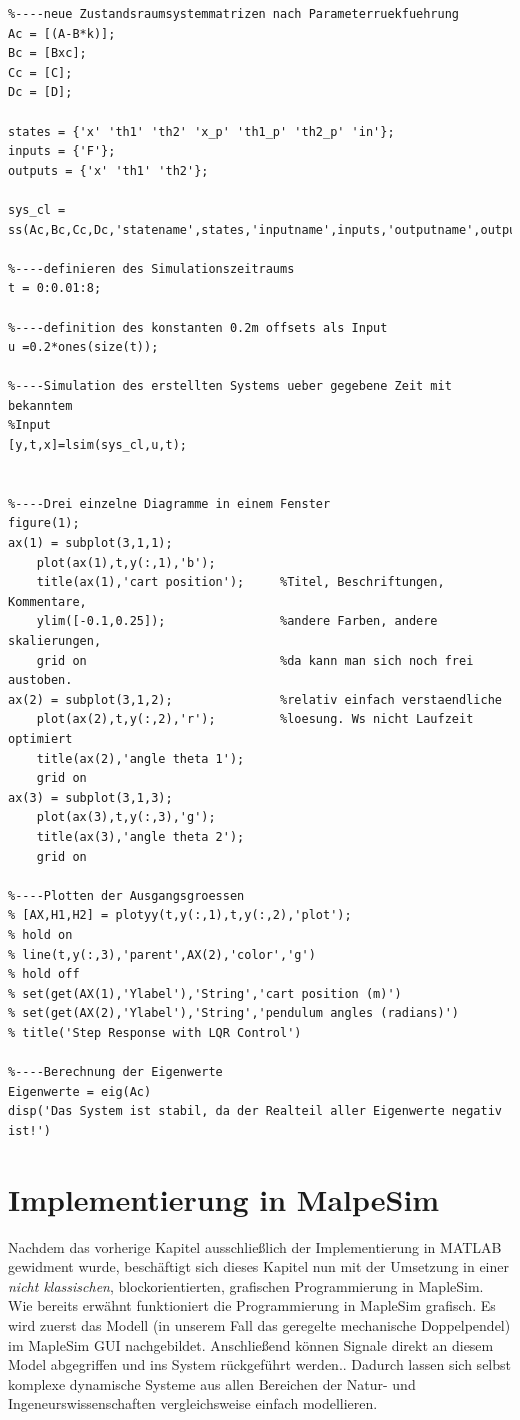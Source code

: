 \documentclass[a4paper, 10pt]{report}
\begin{document}
\begin{lstlisting}
%----neue Zustandsraumsystemmatrizen nach Parameterruekfuehrung
Ac = [(A-B*k)];
Bc = [Bxc];
Cc = [C];
Dc = [D];

states = {'x' 'th1' 'th2' 'x_p' 'th1_p' 'th2_p' 'in'};
inputs = {'F'};
outputs = {'x' 'th1' 'th2'};

sys_cl = ss(Ac,Bc,Cc,Dc,'statename',states,'inputname',inputs,'outputname',outputs);

%----definieren des Simulationszeitraums
t = 0:0.01:8;

%----definition des konstanten 0.2m offsets als Input
u =0.2*ones(size(t));

%----Simulation des erstellten Systems ueber gegebene Zeit mit bekanntem
%Input
[y,t,x]=lsim(sys_cl,u,t);


%----Drei einzelne Diagramme in einem Fenster
figure(1);
ax(1) = subplot(3,1,1);
    plot(ax(1),t,y(:,1),'b');
    title(ax(1),'cart position');     %Titel, Beschriftungen, Kommentare,
    ylim([-0.1,0.25]);                %andere Farben, andere skalierungen,
    grid on                           %da kann man sich noch frei austoben.
ax(2) = subplot(3,1,2);               %relativ einfach verstaendliche 
    plot(ax(2),t,y(:,2),'r');         %loesung. Ws nicht Laufzeit optimiert
    title(ax(2),'angle theta 1');
    grid on
ax(3) = subplot(3,1,3);
    plot(ax(3),t,y(:,3),'g');
    title(ax(3),'angle theta 2');
    grid on

%----Plotten der Ausgangsgroessen
% [AX,H1,H2] = plotyy(t,y(:,1),t,y(:,2),'plot');
% hold on
% line(t,y(:,3),'parent',AX(2),'color','g')
% hold off
% set(get(AX(1),'Ylabel'),'String','cart position (m)')
% set(get(AX(2),'Ylabel'),'String','pendulum angles (radians)')
% title('Step Response with LQR Control')

%----Berechnung der Eigenwerte
Eigenwerte = eig(Ac)
disp('Das System ist stabil, da der Realteil aller Eigenwerte negativ ist!')
\end{lstlisting}

\renewcommand{\thechapter}{}
\chapter{Implementierung in MalpeSim}
\renewcommand{\thechapter}{4}
Nachdem das vorherige Kapitel ausschließlich der Implementierung in MATLAB gewidment wurde, beschäftigt sich dieses Kapitel nun mit der Umsetzung in einer \textit{nicht klassischen}, blockorientierten, grafischen Programmierung in MapleSim. \\
Wie bereits erwähnt funktioniert die Programmierung in MapleSim grafisch. Es wird zuerst das Modell (in unserem Fall das geregelte mechanische Doppelpendel) im MapleSim GUI nachgebildet. Anschließend können Signale direkt an diesem Model abgegriffen und ins System rückgeführt werden.. Dadurch lassen sich selbst komplexe dynamische Systeme aus allen Bereichen der Natur- und Ingeneurswissenschaften vergleichsweise einfach modellieren.
\end{document}
